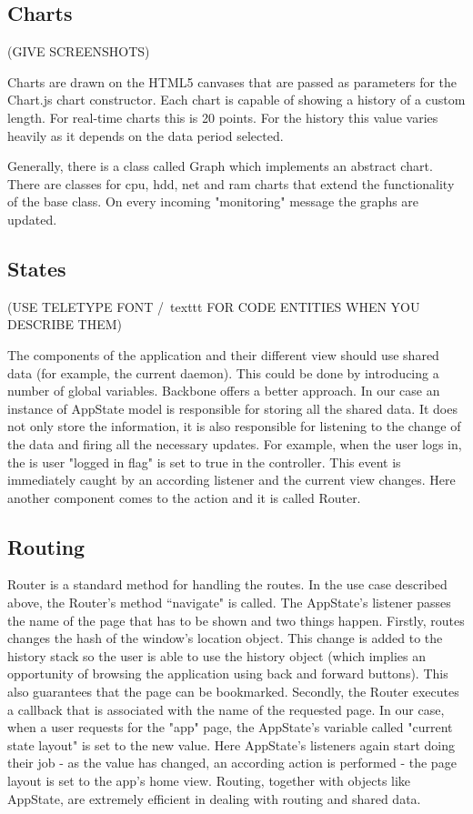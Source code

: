 \documentclass{l3proj}
\begin{document}
\subsection{Charts}

(GIVE SCREENSHOTS)

Charts are drawn on the HTML5 canvases that are passed as parameters for the Chart.js chart constructor. Each chart is capable of showing a history of a custom length. For real-time charts this is 20 points. For the history this value varies heavily as it depends on the data period selected.

Generally, there is a class called Graph which implements an abstract chart. There are classes for cpu, hdd, net and ram charts that extend the functionality of the base class. On every incoming "monitoring" message the graphs are updated.

\subsection{States}

(USE TELETYPE FONT /\ texttt FOR CODE ENTITIES WHEN YOU DESCRIBE THEM)

The components of the application and their different view should use shared data (for example, the current daemon). This could be done by introducing a number of global variables. Backbone offers a better approach. In our case an instance of AppState model is responsible for storing all the shared data. It does not only store the information, it is also responsible for listening to the change of the data and firing all the necessary updates. For example, when the user logs in, the is user "logged in flag" is set to true in the controller. This event is immediately caught by an according listener and the current view changes. Here another component comes to the action and it is called Router.

\subsection{Routing}

Router is a standard method for handling the routes. In the use case described above, the Router's method ``navigate" is called. The AppState's listener passes the name of the page that has to be shown and two things happen. Firstly, routes changes the hash of the window's location object. This change is added to the history stack so the user is able to use the history object (which implies an opportunity of browsing the application using back and forward buttons). This also guarantees that the page can be bookmarked. Secondly, the Router executes a callback that is associated with the name of the requested page. In our case, when a user requests for the "app" page, the AppState's variable called "current state layout" is set to the new value. Here AppState's listeners again start doing their job - as the value has changed, an according action is performed - the page layout is set to the app's home view. Routing, together with objects like AppState, are extremely efficient in dealing with routing and shared data.
\end{document}
